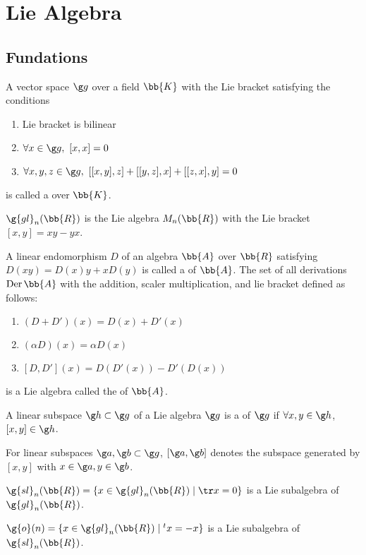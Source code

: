 \newcommand{\gl}{\g{gl}}
\renewcommand{\sl}{\g{sl}}
\renewcommand{\o}{\g{o}}
\section{Lie Algebra\cite{samu}}
\subsection{Fundations}
A vector space $\g g$ over a field $\bb{K}$ with the Lie bracket satisfying the conditions
\begin{enumerate}
\item Lie bracket is bilinear
\item $\forall x \in \g g,\ [x,x] = 0$
\item $\forall x, y, z \in \g g,\ [[x,y],z]+[[y,z],x]+[[z,x],y] = 0$
\end{enumerate}
is called a  over $\bb{K}$.

$\g{gl}_n(\bb{R})$ is the Lie algebra $M_n(\bb{R})$ with the Lie bracket $[x,y] = xy - yx$.

A linear endomorphism $D$ of an algebra $\bb{A}$ over $\bb{R}$ satisfying $D(xy) = D(x)y + xD(y)$ is called a  of $\bb{A}$. The set of all derivations $\mathrm{Der}\, \bb{A}$ with the addition, scaler multiplication, and lie bracket defined as follows:
\begin{enumerate}
\item $(D+D')(x) = D(x)+D'(x)$
\item $(\alpha D)(x) = \alpha D(x)$
\item $[D,D'](x) = D(D'(x)) - D'(D(x))$
\end{enumerate}
is a Lie algebra called the  of $\bb{A}$.

A linear subspace $\g h \subset \g g$ of a Lie algebra $\g g$ is a  of $\g g$ if $\forall x, y \in \g h$, $[x,y] \in \g h$.

For linear subspaces $\g a, \g b \subset \g g$, $[\g a, \g b]$ denotes the subspace generated by $[x,y]$ with $x \in \g a, y \in \g b$.

$\sl_n(\bb{R}) = \{ x \in \gl_n(\bb{R}) \mid \tr x = 0 \} $ is a Lie subalgebra of $\gl_n(\bb{R})$.

$\o(n) = \{ x \in \gl_n(\bb{R}) \mid {}^tx = -x \}$ is a Lie subalgebra of $\sl_n(\bb{R})$.

